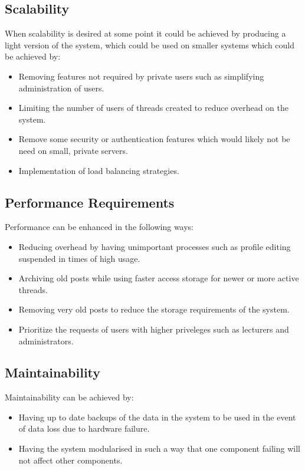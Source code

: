 
\subsection{Scalability}
When scalability is desired at some point it could be achieved by producing a light version of the system, which could be used on smaller systems which could be achieved by:
\begin{itemize}
\item Removing features not required by private users such as simplifying administration of users.
\item Limiting the number of users of threads created to reduce overhead on the system.
\item Remove some security or authentication features which would likely not be need on small, private servers.
\item Implementation of load balancing strategies.

\end{itemize}
	
\subsection{Performance Requirements}
Performance can be enhanced in the following ways:
\begin{itemize}
\item Reducing overhead by having unimportant processes such as profile editing suspended in times of high usage.
\item Archiving old posts while using faster access storage for newer or more active threads.
\item Removing very old posts to reduce the storage requirements of the system.
\item Prioritize the requests of users with higher priveleges such as lecturers and administrators.

\end{itemize}


\subsection{Maintainability}
Maintainability can be achieved by:
\begin{itemize}
\item Having up to date backups of the data in the system to be used in the event of data loss due to hardware failure.
\item Having the system modularised in such a way that one component failing will not affect other components.

\end{itemize}

